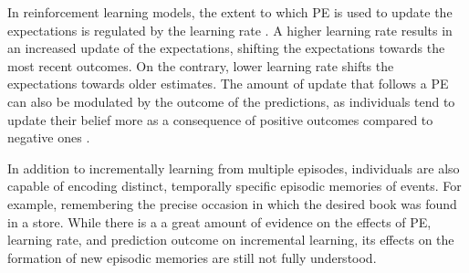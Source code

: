 \documentclass[a4paper,12pt]{article}
\begin{document}
\par In reinforcement learning models, the extent to which PE is used to update the expectations is regulated by the learning rate \citep{Sutton2018a}. A higher learning rate results in an increased update of the expectations, shifting the expectations towards the most recent outcomes. On the contrary, lower learning rate shifts the expectations towards older estimates. The amount of update that follows a PE can also be modulated by the outcome of the predictions, as individuals tend to update their belief more as a consequence of positive outcomes compared to negative ones \citep{Lefebvre2017, sharot2007neural, sharot2011unrealistic, sharot2016forming}.  %
\par
In addition to incrementally learning from multiple episodes, individuals are also capable of encoding distinct, temporally specific episodic memories of events. For example, remembering the precise occasion in which the desired book was found in a store. 
While there is a a great amount of evidence on the effects of PE, learning rate, and prediction outcome on incremental learning, its  effects on the formation of new episodic memories are still not fully understood.\par
\end{document}
